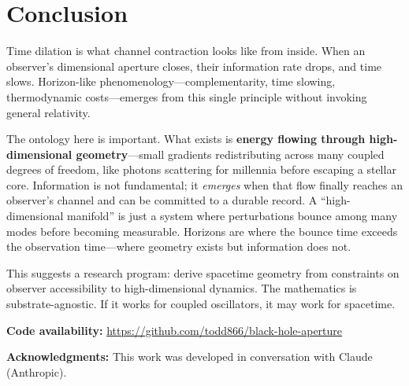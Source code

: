 \documentclass[11pt,a4paper]{article}
\begin{document}
\section{Conclusion}

Time dilation is what channel contraction looks like from inside. When an observer's dimensional aperture closes, their information rate drops, and time slows. Horizon-like phenomenology---complementarity, time slowing, thermodynamic costs---emerges from this single principle without invoking general relativity.

The ontology here is important. What exists is \textbf{energy flowing through high-dimensional geometry}---small gradients redistributing across many coupled degrees of freedom, like photons scattering for millennia before escaping a stellar core. Information is not fundamental; it \emph{emerges} when that flow finally reaches an observer's channel and can be committed to a durable record. A ``high-dimensional manifold'' is just a system where perturbations bounce among many modes before becoming measurable. Horizons are where the bounce time exceeds the observation time---where geometry exists but information does not.

This suggests a research program: derive spacetime geometry from constraints on observer accessibility to high-dimensional dynamics. The mathematics is substrate-agnostic. If it works for coupled oscillators, it may work for spacetime.

\vspace{0.5cm}
\noindent\textbf{Code availability:} \url{https://github.com/todd866/black-hole-aperture}

\vspace{0.5cm}
\noindent\textbf{Acknowledgments:} This work was developed in conversation with Claude (Anthropic).
\end{document}
